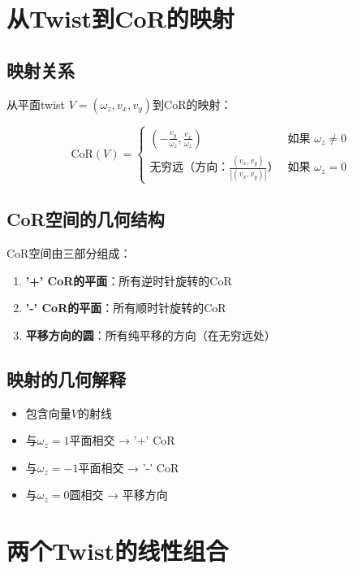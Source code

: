 \documentclass[12pt,a4paper]{article}
\begin{document}
\section{从Twist到CoR的映射}

\subsection{映射关系}

从平面twist $V = (\omega_z, v_x, v_y)$到CoR的映射：

\begin{equation}
\text{CoR}(V) = \begin{cases}
\left(-\frac{v_y}{\omega_z}, \frac{v_x}{\omega_z}\right) & \text{如果 } \omega_z \neq 0 \\
\text{无穷远（方向：}\frac{(v_x, v_y)}{|(v_x, v_y)|}\text{）} & \text{如果 } \omega_z = 0
\end{cases}
\label{eq:cor_mapping}
\end{equation}

\subsection{CoR空间的几何结构}

CoR空间由三部分组成：

\begin{enumerate}
\item \textbf{'+' CoR的平面}：所有逆时针旋转的CoR
\item \textbf{'-' CoR的平面}：所有顺时针旋转的CoR
\item \textbf{平移方向的圆}：所有纯平移的方向（在无穷远处）
\end{enumerate}

\subsection{映射的几何解释}

\begin{itemize}
\item 包含向量$V$的射线
\item 与$\omega_z = 1$平面相交 → '+' CoR
\item 与$\omega_z = -1$平面相交 → '-' CoR
\item 与$\omega_z = 0$圆相交 → 平移方向
\end{itemize}

\section{两个Twist的线性组合}
\end{document}

